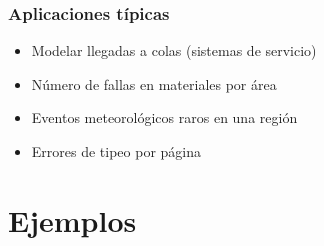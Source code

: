 \documentclass[letterpaper, 12pt]{article}
\begin{document}
	\subsubsection*{Aplicaciones típicas}
	\begin{itemize}
		\item Modelar llegadas a colas (sistemas de servicio)
		\item Número de fallas en materiales por área
		\item Eventos meteorológicos raros en una región
		\item Errores de tipeo por página
	\end{itemize}
	
	\section{Ejemplos}
	
\end{document}
